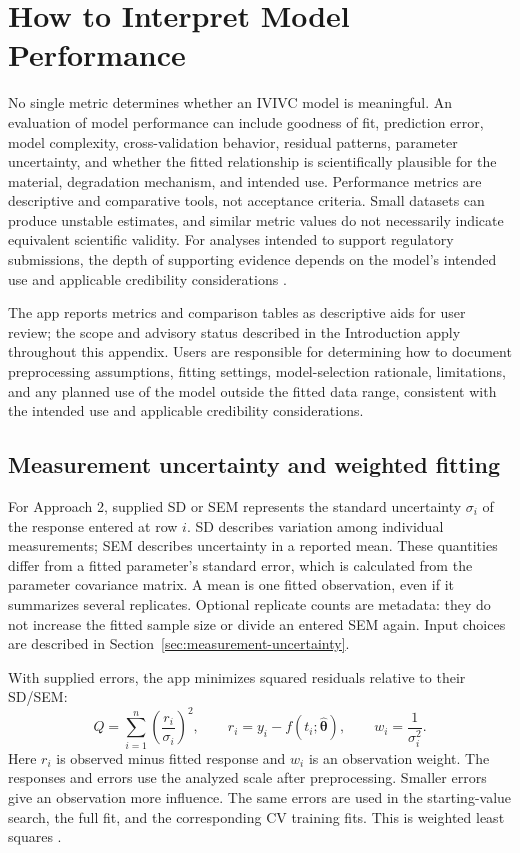 \section{How to Interpret Model Performance}
\label{app:model-performance}

No single metric determines whether an IVIVC model is meaningful. An evaluation of model performance can include goodness of fit, prediction error, model complexity, cross-validation behavior, residual patterns, parameter uncertainty, and whether the fitted relationship is scientifically plausible for the material, degradation mechanism, and intended use. Performance metrics are descriptive and comparative tools, not acceptance criteria. Small datasets can produce unstable estimates, and similar metric values do not necessarily indicate equivalent scientific validity. For analyses intended to support regulatory submissions, the depth of supporting evidence depends on the model's intended use and applicable credibility considerations \cite{fda_modeling_guidance,fda_reporting_guidance}.

The app reports metrics and comparison tables as descriptive aids for user review; the scope and advisory status described in the Introduction apply throughout this appendix. Users are responsible for determining how to document preprocessing assumptions, fitting settings, model-selection rationale, limitations, and any planned use of the model outside the fitted data range, consistent with the intended use and applicable credibility considerations.

\subsection{Measurement uncertainty and weighted fitting}
\label{app:measurement-uncertainty}

For Approach 2, supplied SD or SEM represents the standard uncertainty $\sigma_i$ of the response entered at row $i$. SD describes variation among individual measurements; SEM describes uncertainty in a reported mean. These quantities differ from a fitted parameter's standard error, which is calculated from the parameter covariance matrix. A mean is one fitted observation, even if it summarizes several replicates. Optional replicate counts are metadata: they do not increase the fitted sample size or divide an entered SEM again. Input choices are described in Section~\ref{sec:measurement-uncertainty}.

With supplied errors, the app minimizes squared residuals relative to their SD/SEM:
\[
Q=\sum_{i=1}^{n}\left(\frac{r_i}{\sigma_i}\right)^2,
\qquad r_i=y_i-f(t_i;\widehat{\boldsymbol{\theta}}),
\qquad w_i=\frac{1}{\sigma_i^2}.
\]
Here $r_i$ is observed minus fitted response and $w_i$ is an observation weight. The responses and errors use the analyzed scale after preprocessing. Smaller errors give an observation more influence. The same errors are used in the starting-value search, the full fit, and the corresponding CV training fits. This is weighted least squares \cite{nistWeightedLeastSquares}.


